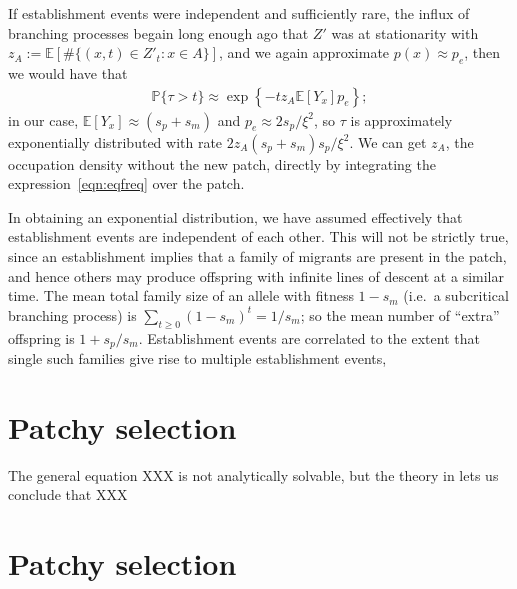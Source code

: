 \documentclass{article}
\renewcommand{\P}{\mathbb{P}}
\newcommand{\E}{\mathbb{E}}
\begin{document}
If establishment events were independent and sufficiently rare,
the influx of branching processes begain long enough ago that $Z'$ was at stationarity
with $z_A := \E[ \# \{ (x,t) \in Z'_t : x \in A \} ]$,
and we again approximate $p(x) \approx p_e$,
then we would have that 
\begin{align}
  \P\{\tau>t\} \approx \exp\left\{ - t z_A \E[Y_x] p_e \right\} ;
\end{align}
in our case, $\E[Y_x] \approx (s_p+s_m)$ and $p_e \approx 2 s_p/\xi^2$,
so $\tau$ is approximately exponentially distributed with rate $ 2 z_A (s_p+s_m) s_p/\xi^2 $.
We can get $z_A$, the occupation density without the new patch, 
directly by integrating the expression~\eqref{eqn:eqfreq} over the patch.

In obtaining an exponential distribution, we have assumed effectively that establishment events
are independent of each other.
This will not be strictly true, since an establishment implies that a family of migrants are present in the patch,
and hence others may produce offspring with infinite lines of descent at a similar time.
The mean total family size of an allele with fitness $1-s_m$ (i.e.\ a subcritical branching process) is $\sum_{t \ge 0} (1-s_m)^t = 1/s_m$;
so the mean number of ``extra'' offspring is $1+s_p/s_m$.
Establishment events are correlated to the extent that single such families give rise to multiple establishment events,





\section{Patchy selection} 
\label{apx:asymptotics}

The general equation XXX is not analytically solvable,
but the theory in \citet{wasow1965asymptotic}
lets us conclude that XXX



\section{Patchy selection} 
\label{ss:discretedemes}
\end{document}
